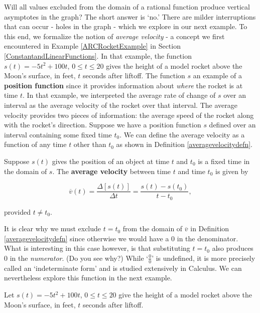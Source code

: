 \begin{ex}
Will all  values excluded from the domain of a rational function produce vertical asymptotes in the graph?  The short answer is `no.'  There are milder interruptions that can occur - holes in the graph - which we explore in our next example.  To this end, we formalize the notion of \textit{average velocity} - a concept we first encountered in  Example \ref{ARCRocketExample} in Section \ref{ConstantandLinearFunctions}. In that example, the function $s(t) = -5t^2+100t$, $0 \leq t \leq 20$ gives the height of a model rocket above the Moon's surface, in feet,  $t$ seconds after liftoff.  The function $s$ an example of a \textbf{position function} since it provides information about \textit{where} the rocket is at time $t$.   In that example, we interpreted the average rate of change of $s$ over an interval as the average velocity of the rocket over that interval.  The average velocity provides two pieces of information:  the average speed of the rocket along with the rocket's direction.  Suppose we have a position function $s$ defined over an interval containing some fixed time $t_{0}$.  We can define the average velocity as a function of any time $t$ other than $t_{0}$ as shown in Definition \ref{averagevelocitydefn}.

\begin{mdefn}
\label{averagevelocitydefn} Suppose $s(t)$ gives the position of an object at time $t$ and $t_{0}$ is a fixed time in the domain of $s$.  The \textbf{average velocity} between time $t$ and time $t_{0}$ is given by

\[ \overline{v}(t) = \dfrac{\Delta [s(t)]}{\Delta t} = \dfrac{s(t) - s(t_{0})}{t - t_{0}}, \]

provided $t \neq t_{0}$.

\end{mdefn}

It is clear why we must exclude $t = t_{0}$ from the domain of $\overline{v}$ in Definition \ref{averagevelocitydefn} since otherwise we would have a $0$ in the denominator.  What is interesting in this case however, is that substituting $t = t_{0}$ also produces $0$ in the \textit{numerator}. (Do you see why?)  While `$\frac{0}{0}$' is undefined, it is more precisely called an `indeterminate form' and is studied extensively in Calculus.  We can nevertheless explore this function in the next example.

\begin{ex} \label{averagevelocityrocketex} Let $s(t) = -5t^2+100t$, $0 \leq t \leq 20$ give the height of a model rocket above the Moon's surface, in feet,  $t$ seconds after liftoff.  


\end{ex}
\end{ex}
